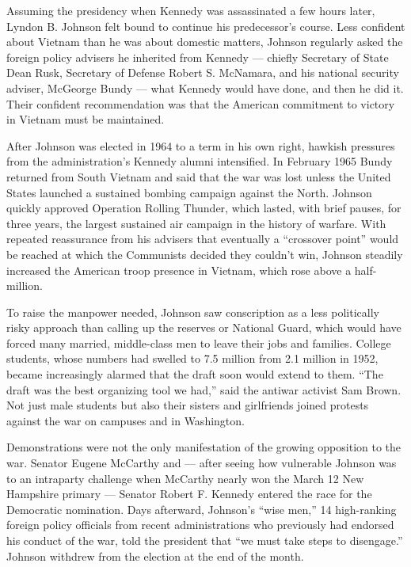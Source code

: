 Assuming the presidency when Kennedy was assassinated a few hours later,
Lyndon B. Johnson felt bound to continue his predecessor's course. Less
confident about Vietnam than he was about domestic matters, Johnson
regularly asked the foreign policy advisers he inherited from Kennedy
--- chiefly Secretary of State Dean Rusk, Secretary of Defense Robert S.
McNamara, and his national security adviser, McGeorge Bundy --- what
Kennedy would have done, and then he did it. Their confident
recommendation was that the American commitment to victory in Vietnam
must be maintained.

After Johnson was elected in 1964 to a term in his own right, hawkish
pressures from the administration's Kennedy alumni intensified. In
February 1965 Bundy returned from South Vietnam and said that the war
was lost unless the United States launched a sustained bombing campaign
against the North. Johnson quickly approved Operation Rolling Thunder,
which lasted, with brief pauses, for three years, the largest sustained
air campaign in the history of warfare. With repeated reassurance from
his advisers that eventually a ``crossover point'' would be reached at
which the Communists decided they couldn't win, Johnson steadily
increased the American troop presence in Vietnam, which rose above a
half-million.

To raise the manpower needed, Johnson saw conscription as a less
politically risky approach than calling up the reserves or National
Guard, which would have forced many married, middle-class men to leave
their jobs and families. College students, whose numbers had swelled to
7.5 million from 2.1 million in 1952, became increasingly alarmed that
the draft soon would extend to them. ``The draft was the best organizing
tool we had,'' said the antiwar activist Sam Brown. Not just male
students but also their sisters and girlfriends joined protests against
the war on campuses and in Washington.

Demonstrations were not the only manifestation of the growing opposition
to the war. Senator Eugene McCarthy and --- after seeing how vulnerable
Johnson was to an intraparty challenge when McCarthy nearly won the
March 12 New Hampshire primary --- Senator Robert F. Kennedy entered the
race for the Democratic nomination. Days afterward, Johnson's ``wise
men,'' 14 high-ranking foreign policy officials from recent
administrations who previously had endorsed his conduct of the war, told
the president that ``we must take steps to disengage.'' Johnson withdrew
from the election at the end of the month.

